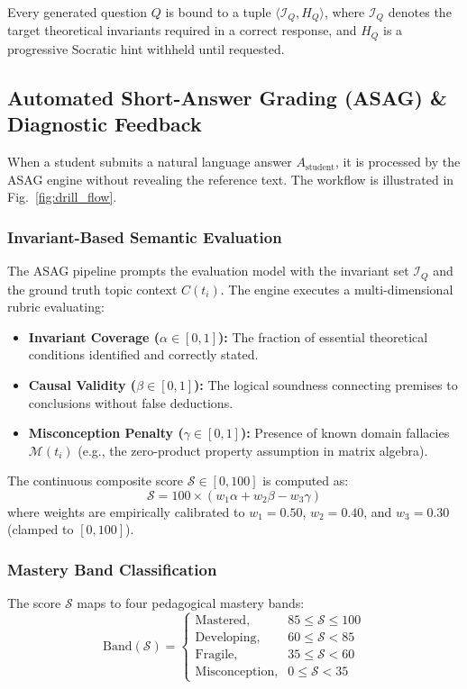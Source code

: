 \documentclass[conference]{IEEEtran}
\begin{document}
Every generated question $Q$ is bound to a tuple $\langle \mathcal{I}_Q, H_Q \rangle$, where $\mathcal{I}_Q$ denotes the target theoretical invariants required in a correct response, and $H_Q$ is a progressive Socratic hint withheld until requested.

\subsection{Automated Short-Answer Grading (ASAG) \& Diagnostic Feedback}
When a student submits a natural language answer $A_{\text{student}}$, it is processed by the ASAG engine without revealing the reference text. The workflow is illustrated in Fig.~\ref{fig:drill_flow}.

\subsubsection{Invariant-Based Semantic Evaluation}
The ASAG pipeline prompts the evaluation model with the invariant set $\mathcal{I}_Q$ and the ground truth topic context $C(t_i)$. The engine executes a multi-dimensional rubric evaluating:
\begin{itemize}
    \item \textbf{Invariant Coverage ($\alpha \in [0, 1]$):} The fraction of essential theoretical conditions identified and correctly stated.
    \item \textbf{Causal Validity ($\beta \in [0, 1]$):} The logical soundness connecting premises to conclusions without false deductions.
    \item \textbf{Misconception Penalty ($\gamma \in [0, 1]$):} Presence of known domain fallacies $\mathcal{M}(t_i)$ (e.g., the zero-product property assumption in matrix algebra).
\end{itemize}

The continuous composite score $\mathcal{S} \in [0, 100]$ is computed as:
\begin{equation}
\mathcal{S} = 100 \times \left( w_1 \alpha + w_2 \beta - w_3 \gamma \right)
\end{equation}
where weights are empirically calibrated to $w_1 = 0.50$, $w_2 = 0.40$, and $w_3 = 0.30$ (clamped to $[0, 100]$).

\subsubsection{Mastery Band Classification}
The score $\mathcal{S}$ maps to four pedagogical mastery bands:
\begin{equation}
\text{Band}(\mathcal{S}) = 
\begin{cases} 
\text{Mastered}, & 85 \le \mathcal{S} \le 100 \\
\text{Developing}, & 60 \le \mathcal{S} < 85 \\
\text{Fragile}, & 35 \le \mathcal{S} < 60 \\
\text{Misconception}, & 0 \le \mathcal{S} < 35 
\end{cases}
\end{equation}
\end{document}

